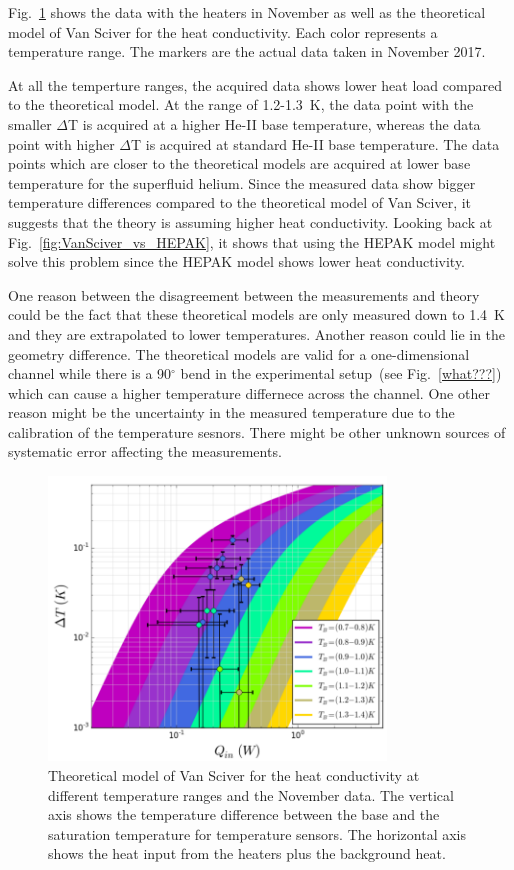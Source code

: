 Fig.~\ref{fig:November_Data} shows the data with the heaters in
November as well as the theoretical model of Van Sciver for the heat
conductivity. Each color represents a temperature range. The markers
are the actual data taken in November 2017.

At all the temperture ranges, the acquired data shows lower heat load
compared to the theoretical model. At the range of 1.2-1.3~K, the data
point with the smaller $\Delta$T is acquired at a higher He-II base
temperature, whereas the data point with higher $\Delta$T is acquired
at standard He-II base temperature. The data points which are closer
to the theoretical models are acquired at lower base temperature for
the superfluid helium. Since the measured data show bigger temperature
differences compared to the theoretical model of Van Sciver, it
suggests that the theory is assuming higher heat conductivity. Looking
back at Fig.~\ref{fig:VanSciver_vs_HEPAK}, it shows that using the
HEPAK model might solve this problem since the HEPAK model shows lower
heat conductivity.

One reason between the disagreement between the measurements and
theory could be the fact that these theoretical models are only
measured down to 1.4~K and they are extrapolated to lower
temperatures. Another reason could lie in the geometry difference. The
theoretical models are valid for a one-dimensional channel while there
is a 90$^\circ$ bend in the experimental setup~(see
Fig.~\ref{what???}) which can cause a higher temperature differnece
across the channel. One other reason might be the uncertainty in the
measured temperature due to the calibration of the temperature
sesnors. There might be other unknown sources of systematic error
affecting the measurements.


\begin{figure}[h!]
  \centering \includegraphics[width=0.8\textwidth]{November_Data.png}
  \caption{Theoretical model of Van Sciver for the heat conductivity
    at different temperature ranges and the November data. The
    vertical axis shows the temperature difference between the base
    and the saturation temperature for temperature sensors. The
    horizontal axis shows the heat input from the heaters plus the
    background heat.}
\label{fig:November_Data}
\end{figure}
